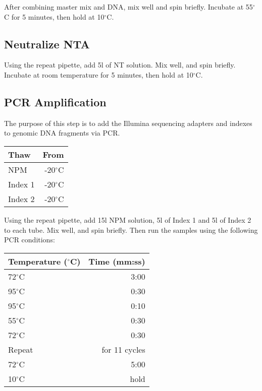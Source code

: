 \documentclass[letterpaper]{article}
\begin{document}
After combining master mix and DNA, mix well and spin briefly. Incubate at 55$^{\circ}$C for 5 minutes, then hold at 10$^{\circ}$C.

\subsection{Neutralize NTA}

Using the repeat pipette, add 5\unit{}{\micro}l of NT solution. Mix well, and spin briefly. Incubate at room temperature for 5 minutes, then hold at 10$^{\circ}$C.

\subsection{PCR Amplification}

The purpose of this step is to add the Illumina sequencing adapters and indexes to genomic DNA fragments via PCR. 

\begin{table}[H]
\centering
\begin{tabular}{l|r}
Thaw & From \\\hline
NPM & -20$^{\circ}$C \\
Index 1 & -20$^{\circ}$C \\
Index 2 & -20$^{\circ}$C \\
\end{tabular}
\end{table}

Using the repeat pipette, add 15\unit{}{\micro}l NPM solution, 5\unit{}{\micro}l of Index 1 and 5\unit{}{\micro}l of Index 2 to each tube. Mix well, and spin briefly. Then run the samples using the following PCR conditions:

\begin{table}[H]
\centering
\begin{tabular}{l|r}
Temperature ($^{\circ}$C) & Time (mm:ss) \\\hline
72$^{\circ}$C  & 3:00 \\
95$^{\circ}$C & 0:30 \\
\hline
95$^{\circ}$C & 0:10 \\
55$^{\circ}$C & 0:30 \\
72$^{\circ}$C & 0:30 \\
Repeat & for 11 cycles \\
\hline
72$^{\circ}$C & 5:00 \\
10$^{\circ}$C & hold
\end{tabular}
\end{table}
\end{document}
